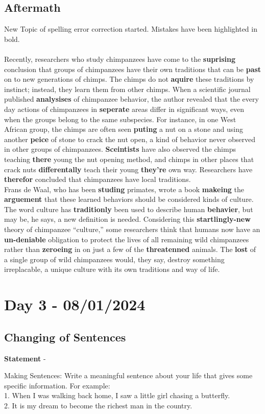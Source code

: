 \documentclass[a4paper,30pt]{report}
\begin{document}
    \section{Aftermath}
      New Topic of spelling error correction started. Mistakes have been highlighted in bold. \\\\
      Recently, researchers who study chimpanzees have come to the \textbf{suprising} conclusion that groups of chimpanzees have
their own traditions that can be \textbf{past} on to new generations of chimps. The chimps do not \textbf{aquire} these traditions by
instinct; instead, they learn them from other chimps. When a scientific journal published \textbf{analysises} of chimpanzee
behavior, the author revealed that the every day actions of chimpanzees in \textbf{seperate} areas differ in significant ways, even
when the groups belong to the same subspecies. For instance, in one West African group, the chimps are often seen \textbf{puting}
a nut on a stone and using another \textbf{peice} of stone to crack the nut open, a kind of behavior never observed in other groups
of chimpanzees. \textbf{Sceintists} have also observed the chimps teaching \textbf{there} young the nut opening method, and chimps in
other places that crack nuts \textbf{differentally} teach their young \textbf{they’re} own way. Researchers have \textbf{therefor} concluded that
chimpanzees have local traditions.\\
Frans de Waal, who has been \textbf{studing} primates, wrote a book \textbf{makeing} the \textbf{arguement} that these learned behaviors
should be considered kinds of culture. The word culture has \textbf{traditionly} been used to describe human \textbf{behavier}, but may be,
he says, a new definition is needed. Considering this \textbf{startlingly-new} theory of chimpanzee “culture,” some researchers
think that humans now have an \textbf{un-deniable} obligation to protect the lives of all remaining wild chimpanzees rather than
\textbf{zeroeing} in on just a few of the \textbf{threatenned} animals. The \textbf{lost} of a single group of wild chimpanzees would, they say,
destroy something irreplacable, a unique culture with its own traditions and way of life.\\

  \chapter{Day 3 - 08/01/2024}%
  \section{Changing of Sentences}
    \textbf{Statement} - \\
    \par Making Sentences:
Write a meaningful sentence about your life that gives some specific information. For example: \\
1. When I was walking back home, I saw a little girl chasing a butterfly.\\
2. It is my dream to become the richest man in the country.\\
\end{document}
